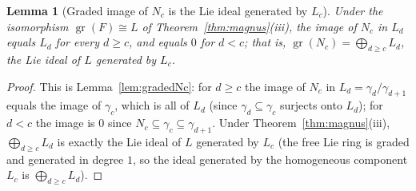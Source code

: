 \documentclass{amsart}
\newtheorem{lemma}{Lemma}
\theoremstyle{definition}
\theoremstyle{remark}
\begin{document}
\begin{lemma}[Graded image of $N_c$ is the Lie ideal generated by $L_c$]
\label{lem:grNc}
Under the isomorphism $\operatorname{gr}(F)\cong L$ of Theorem~\ref{thm:magnus}(iii),
the image of $N_c$ in $L_d$ equals $L_d$ for every $d\ge c$, and equals $0$ for
$d<c$; that is, $\operatorname{gr}(N_c)=\bigoplus_{d\ge c}L_d$, the Lie ideal of $L$
generated by $L_c$.
\end{lemma}
\begin{proof}
This is Lemma~\ref{lem:gradedNc}: for $d\ge c$ the image of $N_c$ in
$L_d=\gamma_d/\gamma_{d+1}$ equals the image of $\gamma_c$, which is all of $L_d$
(since $\gamma_d\subseteq\gamma_c$ surjects onto $L_d$); for $d<c$ the image is $0$
since $N_c\subseteq\gamma_c\subseteq\gamma_{d+1}$. Under
Theorem~\ref{thm:magnus}(iii), $\bigoplus_{d\ge c}L_d$ is exactly the Lie ideal of
$L$ generated by $L_c$ (the free Lie ring is graded and generated in degree $1$, so
the ideal generated by the homogeneous component $L_c$ is $\bigoplus_{d\ge c}L_d$).
\end{proof}
\end{document}
